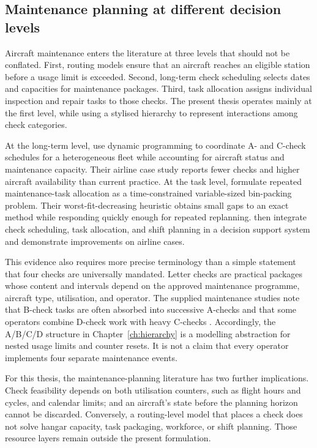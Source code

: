 \subsection{Maintenance planning at different decision levels}

Aircraft maintenance enters the literature at three levels that should not be
conflated. First, routing models ensure that an aircraft reaches an eligible
station before a usage limit is exceeded. Second, long-term check scheduling
selects dates and capacities for maintenance packages. Third, task allocation
assigns individual inspection and repair tasks to those checks. The present
thesis operates mainly at the first level, while using a stylised hierarchy to
represent interactions among check categories.

At the long-term level, \citet{deng2020maintenance} use dynamic programming to
coordinate A- and C-check schedules for a heterogeneous fleet while accounting
for aircraft status and maintenance capacity. Their airline case study reports
fewer checks and higher aircraft availability than current practice. At the
task level, \citet{witteman2021binpacking} formulate repeated maintenance-task
allocation as a time-constrained variable-sized bin-packing problem. Their
worst-fit-decreasing heuristic obtains small gaps to an exact method while
responding quickly enough for repeated replanning. \citet{deng2021dss} then
integrate check scheduling, task allocation, and shift planning in a decision
support system and demonstrate improvements on airline cases.

This evidence also requires more precise terminology than a simple statement
that four checks are universally mandated. Letter checks are practical packages
whose content and intervals depend on the approved maintenance programme,
aircraft type, utilisation, and operator. The supplied maintenance studies note
that B-check tasks are often absorbed into successive A-checks and that some
operators combine D-check work with heavy C-checks
\citep{deng2020maintenance, witteman2021binpacking, deng2021dss}. Accordingly,
the A/B/C/D structure in Chapter~\ref{ch:hierarchy} is a modelling abstraction
for nested usage limits and counter resets. It is not a claim that every
operator implements four separate maintenance events.

For this thesis, the maintenance-planning literature has two further
implications. Check feasibility depends on both utilisation counters, such as
flight hours and cycles, and calendar limits; and an aircraft's state before the
planning horizon cannot be discarded. Conversely, a routing-level model that
places a check does not solve hangar capacity, task packaging, workforce, or
shift planning. Those resource layers remain outside the present formulation.


